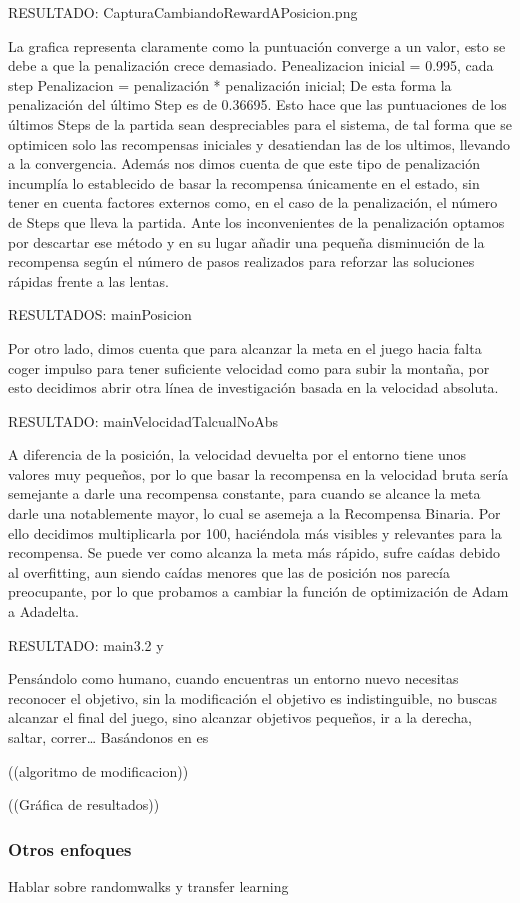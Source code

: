  RESULTADO: CapturaCambiandoRewardAPosicion.png

La grafica representa claramente como la puntuación converge a un valor, esto se debe a que la penalización crece demasiado.
Penealizacion inicial = 0.995, cada step Penalizacion = penalización * penalización inicial; 
De esta forma la penalización del último Step es de 0.36695. Esto hace que las puntuaciones de los últimos Steps de la partida sean despreciables para el sistema, de tal forma que se optimicen solo las recompensas iniciales y desatiendan las de los ultimos, llevando a la convergencia. 
Además nos dimos cuenta de que este tipo de penalización incumplía lo establecido de basar la recompensa únicamente en el estado, sin tener en cuenta factores externos como, en el caso de la penalización, el número de Steps que lleva la partida.
Ante los inconvenientes de la penalización optamos por descartar ese método y en su lugar añadir una pequeña disminución de la recompensa según el número de pasos realizados para reforzar las soluciones rápidas frente a las lentas.

RESULTADOS: mainPosicion



Por otro lado, dimos cuenta que para alcanzar la meta en el juego hacia falta coger impulso para tener suficiente velocidad como para subir la montaña, por esto decidimos abrir otra línea de investigación basada en la velocidad absoluta.

RESULTADO: mainVelocidadTalcualNoAbs

A diferencia de la posición, la velocidad devuelta por el entorno tiene unos valores muy pequeños, por lo que basar la recompensa en la velocidad bruta sería semejante a darle una recompensa constante, para cuando se alcance la meta darle una notablemente mayor, lo cual se asemeja a la Recompensa Binaria. Por ello decidimos multiplicarla por 100, haciéndola más visibles y relevantes para la recompensa. 
Se puede ver como alcanza la meta más rápido, sufre caídas debido al overfitting, aun siendo caídas menores que las de posición nos parecía preocupante, por lo que probamos a cambiar la función de optimización de Adam a Adadelta.

RESULTADO: main3.2 y  

Pensándolo como humano, cuando encuentras un entorno nuevo necesitas reconocer el objetivo, sin la modificación el objetivo es indistinguible, no buscas alcanzar el final del juego, sino alcanzar objetivos pequeños, ir a la derecha, saltar, correr… Basándonos en es

 


((algoritmo de modificacion))

((Gráfica de resultados))

\subsubsection*{Otros enfoques}
Hablar sobre randomwalks y transfer learning